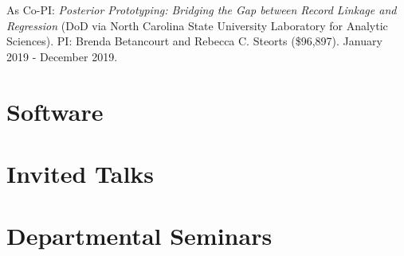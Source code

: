 \documentclass[margin,line]{res}
\begin{document}
\begin{resume}
As Co-PI: {\em Posterior Prototyping: Bridging the Gap between Record Linkage and Regression} (DoD via North Carolina State University Laboratory for Analytic Sciences). PI: Brenda Betancourt and Rebecca C. Steorts (\$96,897). January 2019 - December 2019.


%  
%  
%  
%  
%  

\section{\sc Software}
\printbibliography[keyword=packages, heading=none, resetnumbers=true]

\section{\sc Invited Talks}
\printbibliography[keyword=talk-invited, heading=none, resetnumbers=true]

\section{\sc Departmental Seminars}
\printbibliography[keyword=seminar, heading=none, resetnumbers=true]


\end{resume}
\end{document}
